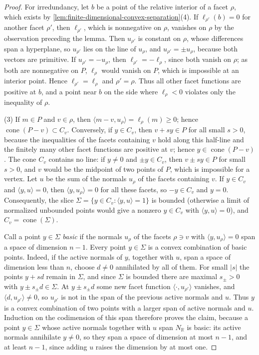 \begin{proof}
For irredundancy, let $b$ be a point of the relative interior of a facet $\rho$, which exists by \cref{lem:finite-dimensional-convex-separation}(4). If $\ell_{\rho'}(b)=0$ for another facet $\rho'$, then $\ell_{\rho'}$, which is nonnegative on $\rho$, vanishes on $\rho$ by the observation preceding the lemma. Then $u_{\rho'}$ is constant on $\rho$, whose differences span a hyperplane, so $u_{\rho'}$ lies on the line of $u_\rho$, and $u_{\rho'}=\pm u_\rho$, because both vectors are primitive. If $u_{\rho'}=-u_\rho$, then $\ell_{\rho'}=-\ell_\rho$, since both vanish on $\rho$; as both are nonnegative on $P$, $\ell_\rho$ would vanish on $P$, which is impossible at an interior point. Hence $\ell_{\rho'}=\ell_\rho$ and $\rho'=\rho$. Thus all other facet functions are positive at $b$, and a point near $b$ on the side where $\ell_\rho<0$ violates only the inequality of $\rho$.

(3) If $m\in P$ and $v\in\rho$, then $\langle m-v,u_\rho\rangle=\ell_\rho(m)\geq0$; hence $\operatorname{cone}(P-v)\subset C_v$. Conversely, if $y\in C_v$, then $v+sy\in P$ for all small $s>0$, because the inequalities of the facets containing $v$ hold along this half-line and the finitely many other facet functions are positive at $v$; hence $y\in\operatorname{cone}(P-v)$. The cone $C_v$ contains no line: if $y\neq0$ and $\pm y\in C_v$, then $v\pm sy\in P$ for small $s>0$, and $v$ would be the midpoint of two points of $P$, which is impossible for a vertex. Let $u$ be the sum of the normals $u_\rho$ of the facets containing $v$. If $y\in C_v$ and $\langle y,u\rangle=0$, then $\langle y,u_\rho\rangle=0$ for all these facets, so $-y\in C_v$ and $y=0$. Consequently, the slice $\Sigma=\{y\in C_v:\langle y,u\rangle=1\}$ is bounded (otherwise a limit of normalized unbounded points would give a nonzero $y\in C_v$ with $\langle y,u\rangle=0$), and $C_v=\operatorname{cone}(\Sigma)$.

Call a point $y\in\Sigma$ \emph{basic} if the normals $u_\rho$ of the facets $\rho\ni v$ with $\langle y,u_\rho\rangle=0$ span a space of dimension $n-1$. Every point $y\in\Sigma$ is a convex combination of basic points. Indeed, if the active normals of $y$, together with $u$, span a space of dimension less than $n$, choose $d\neq0$ annihilated by all of them. For small $|s|$ the points $y+sd$ remain in $\Sigma$, and since $\Sigma$ is bounded there are maximal $s_\pm>0$ with $y\pm s_\pm d\in\Sigma$. At $y\pm s_\pm d$ some new facet function $\langle\cdot,u_{\rho'}\rangle$ vanishes, and $\langle d,u_{\rho'}\rangle\neq0$, so $u_{\rho'}$ is not in the span of the previous active normals and $u$. Thus $y$ is a convex combination of two points with a larger span of active normals and $u$. Induction on the codimension of this span therefore proves the claim, because a point $y\in\Sigma$ whose active normals together with $u$ span $N_{\mathbb R}$ is basic: its active normals annihilate $y\neq0$, so they span a space of dimension at most $n-1$, and at least $n-1$, since adding $u$ raises the dimension by at most one.


\end{proof}

